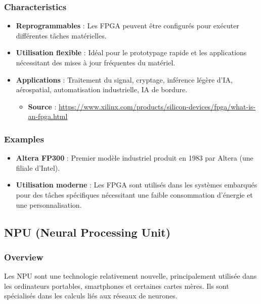 \documentclass[10pt,a4paper]{article}
\begin{document}
\subsubsection*{Characteristics}
\begin{itemize}
    \item \textbf{Reprogrammables} : Les FPGA peuvent être configurés pour exécuter différentes tâches matérielles.
    \item \textbf{Utilisation flexible} : Idéal pour le prototypage rapide et les applications nécessitant des mises à jour fréquentes du matériel.
    \item \textbf{Applications} : Traitement du signal, cryptage, inférence légère d'IA, aérospatial, automatisation industrielle, IA de bordure.
    \begin{itemize}
        \item \textbf{Source} : \url{https://www.xilinx.com/products/silicon-devices/fpga/what-is-an-fpga.html}
    \end{itemize}
\end{itemize}

\subsubsection*{Examples}
\begin{itemize}
    \item \textbf{Altera FP300} : Premier modèle industriel produit en 1983 par Altera (une filiale d'Intel).
    \item \textbf{Utilisation moderne} : Les FPGA sont utilisés dans les systèmes embarqués pour des tâches spécifiques nécessitant une faible consommation d'énergie et une personnalisation.
\end{itemize}

\subsection*{NPU (Neural Processing Unit)}

\subsubsection*{Overview}
Les NPU sont une technologie relativement nouvelle, principalement utilisée dans les ordinateurs portables, smartphones et certaines cartes mères. Ils sont spécialisés dans les calculs liés aux réseaux de neurones.
\end{document}
